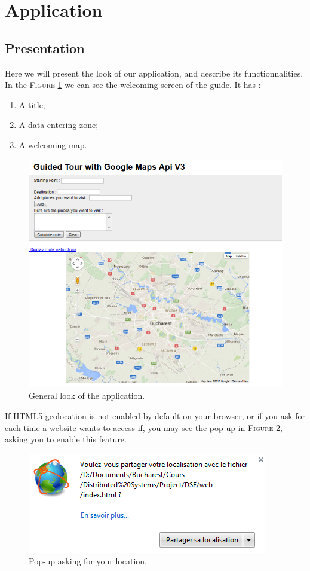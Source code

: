 \section{Application}
	\subsection{Presentation}
	
	Here we will present the look of our application, and describe its functionnalities. In the \textsc{Figure} \ref{fig:general} we can see the welcoming screen of the guide.
	It has :
	\begin{enumerate}
		\item A title;
		\item A data entering zone;
		\item A welcoming map.
	\end{enumerate}
		\begin{figure}[h!]
			\centering
			\includegraphics[scale=0.7]{input/general_look.png}
			\caption{\label{fig:general}General look of the application.}
		\end{figure}
		
		If HTML5 geolocation is not enabled by default on your browser, or if you ask for each time a website wants to access if, you may see the pop-up in \textsc{Figure} \ref{fig:geoloc}, asking you to enable this feature.
		\begin{figure}[h!]
			\centering
			\includegraphics{input/geoloc.png}
			\caption{\label{fig:geoloc}Pop-up asking for your location.}
		\end{figure}
		
